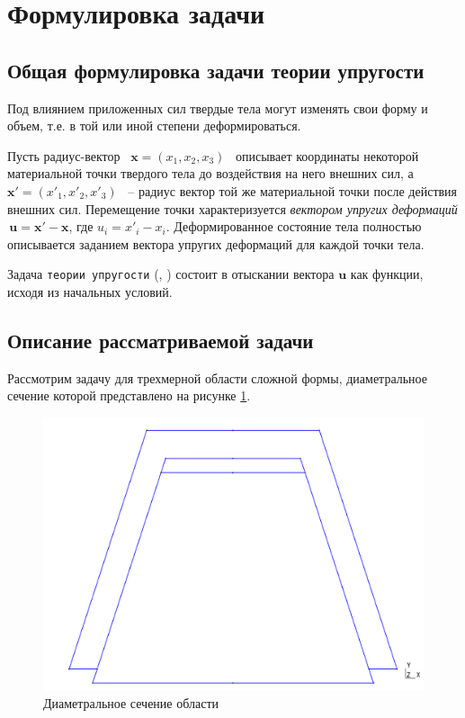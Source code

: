 \documentclass[a4paper, 14pt]{extreport}
\begin{document}
\section{Формулировка задачи}
\subsection{Общая формулировка задачи теории упругости}


Под влиянием приложенных сил твердые тела могут изменять свои форму и объем, 
т.е. в той или иной степени деформироваться.

Пусть радиус-вектор \, $\textbf{x} = (x_1, x_2, x_3)$ \, описывает координаты 
некоторой материальной точки твердого тела до воздействия на него внешних сил,
а \, $\textbf{x}' = (x'_1, x'_2, x'_3)$ \, -- радиус вектор той же материальной
точки после действия внешних сил. Перемещение точки характеризуется 
\textit{вектором упругих деформаций} \,$\textbf{u} = \textbf{x}' - \textbf{x}$, 
где  $u_i = x'_i - x_i$. Деформированное состояние тела
полностью описывается заданием вектора упругих деформаций для каждой точки тела.

Задача \texttt{теории упругости} (\cite{math_elasticity_theory},
\cite{landau}) состоит в 
отыскании вектора $\textbf{u}$ как функции, исходя из начальных условий.

\subsection{Описание рассматриваемой задачи}

Рассмотрим задачу для трехмерной области сложной формы, диаметральное сечение
которой представлено на рисунке \ref{fig: domain}.
\begin{figure}[h]
	\center
	\includegraphics[scale=0.3]{pictures/1.png}
	\caption{Диаметральное сечение области}
	\label{fig: domain}
\end{figure}
\end{document}
